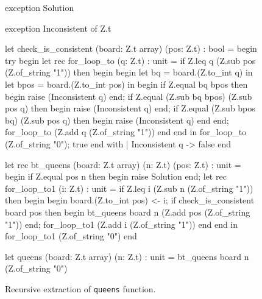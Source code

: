 \begin{figure}
\begin{whycode}
exception Solution

exception Inconsistent of Z.t

let check_is_consistent (board: Z.t array) (pos: Z.t) : bool =
  begin try
    begin
      let rec for_loop_to (q: Z.t) : unit =
        if Z.leq q (Z.sub pos (Z.of_string "1"))
        then begin
          begin
            let bq = board.(Z.to_int q) in
            let bpos = board.(Z.to_int pos) in
            begin
              if Z.equal bq bpos then begin raise (Inconsistent q) end;
              if Z.equal (Z.sub bq bpos) (Z.sub pos q)
              then begin
                raise (Inconsistent q) end;
              if Z.equal (Z.sub bpos bq) (Z.sub pos q)
              then begin
                raise (Inconsistent q) end
            end; for_loop_to (Z.add q (Z.of_string "1"))
          end end in
      for_loop_to (Z.of_string "0"); true
    end with
  | Inconsistent q -> false
  end

let rec bt_queens (board: Z.t array) (n: Z.t) (pos: Z.t) : unit =
  begin
    if Z.equal pos n then begin raise Solution end;
    let rec for_loop_to1 (i: Z.t) : unit =
      if Z.leq i (Z.sub n (Z.of_string "1"))
      then begin
        begin
          board.(Z.to_int pos) <- i;
          if check_is_consistent board pos
          then begin
            bt_queens board n (Z.add pos (Z.of_string "1")) end;
          for_loop_to1 (Z.add i (Z.of_string "1"))
        end end in
    for_loop_to1 (Z.of_string "0")
  end

let queens (board: Z.t array) (n: Z.t) : unit =
  bt_queens board n (Z.of_string "0")
\end{whycode}
\label{fig:extract-queens}
\caption{Recursive extraction of \texttt{queens} function.}
\end{figure}

